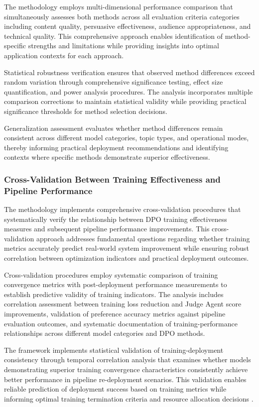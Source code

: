 The methodology employs multi-dimensional performance comparison that simultaneously assesses both methods across all evaluation criteria categories including content quality, persuasive effectiveness, audience appropriateness, and technical quality. This comprehensive approach enables identification of method-specific strengths and limitations while providing insights into optimal application contexts for each approach.

Statistical robustness verification ensures that observed method differences exceed random variation through comprehensive significance testing, effect size quantification, and power analysis procedures. The analysis incorporates multiple comparison corrections to maintain statistical validity while providing practical significance thresholds for method selection decisions.

Generalization assessment evaluates whether method differences remain consistent across different model categories, topic types, and operational modes, thereby informing practical deployment recommendations and identifying contexts where specific methods demonstrate superior effectiveness.

\subsubsection{Cross-Validation Between Training Effectiveness and Pipeline Performance}

The methodology implements comprehensive cross-validation procedures that systematically verify the relationship between DPO training effectiveness measures and subsequent pipeline performance improvements. This cross-validation approach addresses fundamental questions regarding whether training metrics accurately predict real-world system improvement while ensuring robust correlation between optimization indicators and practical deployment outcomes.

Cross-validation procedures employ systematic comparison of training convergence metrics with post-deployment performance measurements to establish predictive validity of training indicators. The analysis includes correlation assessment between training loss reduction and Judge Agent score improvements, validation of preference accuracy metrics against pipeline evaluation outcomes, and systematic documentation of training-performance relationships across different model categories and DPO methods.

The framework implements statistical validation of training-deployment consistency through temporal correlation analysis that examines whether models demonstrating superior training convergence characteristics consistently achieve better performance in pipeline re-deployment scenarios. This validation enables reliable prediction of deployment success based on training metrics while informing optimal training termination criteria and resource allocation decisions \cite{chen2024meta_evaluation}.

